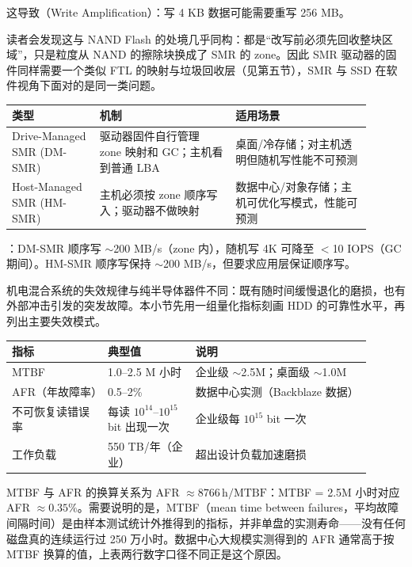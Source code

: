 这导致（Write Amplification）：写 4 KB 数据可能需要重写 256 MB。

读者会发现这与 NAND Flash 的处境几乎同构：都是“改写前必须先回收整块区域”，只是粒度从 NAND 的擦除块换成了 SMR 的 zone。因此 SMR 驱动器的固件同样需要一个类似 FTL 的映射与垃圾回收层（见第五节），SMR 与 SSD 在软件视角下面对的是同一类问题。

\begin{longtable}{L{0.22\linewidth}L{0.34\linewidth}L{0.34\linewidth}}
\toprule
类型 & 机制 & 适用场景 \\
\midrule
Drive-Managed SMR (DM-SMR) & 驱动器固件自行管理 zone 映射和 GC；主机看到普通 LBA & 桌面/冷存储；对主机透明但随机写性能不可预测 \\\tablerowrule
Host-Managed SMR (HM-SMR) & 主机必须按 zone 顺序写入；驱动器不做映射 & 数据中心/对象存储；主机可优化写模式，性能可预测 \\
\bottomrule
\end{longtable}

：DM-SMR 顺序写 $\sim$200 MB/s（zone 内），随机写 4K 可降至 $<$10 IOPS（GC 期间）。HM-SMR 顺序写保持 $\sim$200 MB/s，但要求应用层保证顺序写。


机电混合系统的失效规律与纯半导体器件不同：既有随时间缓慢退化的磨损，也有外部冲击引发的突发故障。本小节先用一组量化指标刻画 HDD 的可靠性水平，再列出主要失效模式。

\begin{longtable}{L{0.24\linewidth}L{0.22\linewidth}L{0.44\linewidth}}
\toprule
指标 & 典型值 & 说明 \\
\midrule
MTBF & 1.0--2.5 M 小时 & 企业级 $\sim$2.5M；桌面级 $\sim$1.0M \\\tablerowrule
AFR（年故障率） & 0.5--2\% & 数据中心实测（Backblaze 数据） \\\tablerowrule
不可恢复读错误率 & 每读 $10^{14}$--$10^{15}$ bit 出现一次 & 企业级每 $10^{15}$ bit 一次 \\\tablerowrule
工作负载 & 550 TB/年（企业） & 超出设计负载加速磨损 \\
\bottomrule
\end{longtable}

MTBF 与 AFR 的换算关系为 AFR $\approx 8766\,\mathrm{h} / \mathrm{MTBF}$：MTBF = 2.5M 小时对应 AFR $\approx 0.35\%$。需要说明的是，MTBF（mean time between failures，平均故障间隔时间）是由样本测试统计外推得到的指标，并非单盘的实测寿命——没有任何磁盘真的连续运行过 250 万小时。数据中心大规模实测得到的 AFR 通常高于按 MTBF 换算的值，上表两行数字口径不同正是这个原因。

